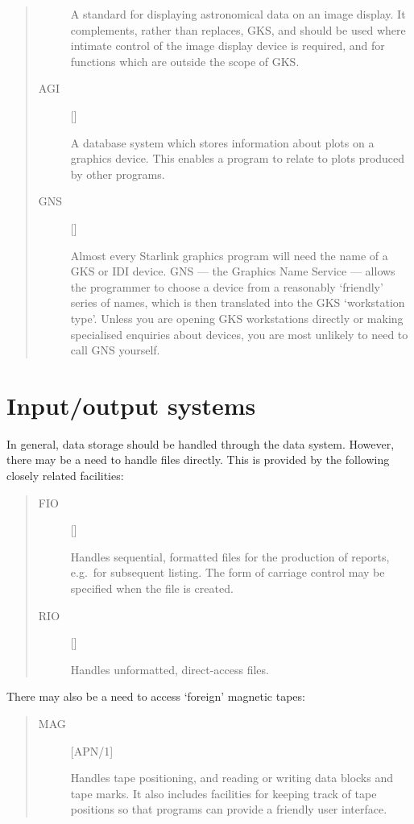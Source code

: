 \begin{quote}
\begin{description}
 A standard for displaying astronomical data on an image display.
 It complements, rather than replaces, GKS, and should be used where intimate
 control of the image display device is required, and for functions which
 are outside the scope of GKS.

\item [AGI] \hfill []

 A database system which stores information about plots on a graphics device.
 This enables a program to relate to plots produced by other programs.

\item [GNS] \hfill []
 
 Almost every Starlink graphics program will need the name of a GKS or IDI
 device.
 GNS --- the Graphics Name Service --- allows the programmer to choose a device
 from a reasonably `friendly' series of names, which is then translated into the
 GKS `workstation type'.
 Unless you are opening GKS workstations directly or making specialised
 enquiries about devices, you are most unlikely to need to call GNS yourself.

\end{description}
\end{quote}

\section{Input/output systems}

In general, data storage should be handled through the data system.
However, there may be a need to handle files directly.
This is provided by the following closely related facilities:
\begin{quote}
\begin{description}

\item [FIO] \hfill []

 Handles sequential, formatted files for the production of reports, e.g.\ for
 subsequent listing.
 The form of carriage control may be specified when the file is created.

\item [RIO] \hfill []

 Handles unformatted, direct-access files.

\end{description}
\end{quote}
There may also be a need to access `foreign' magnetic tapes:
\begin{quote}
\begin{description}

\item [MAG] \hfill [APN/1]

 Handles tape positioning, and reading or writing data blocks and tape marks.
 It also includes facilities for keeping track of tape positions so that
 programs can provide a friendly user interface.

\end{description}
\end{quote}

